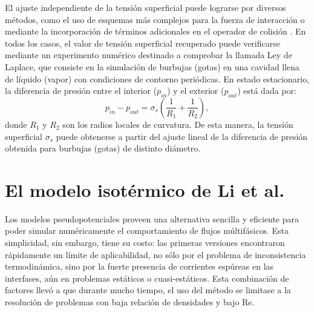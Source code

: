 El ajuste independiente de la tensi\'on superficial puede lograrse por diversos m\'etodos, como el uso de esquemas m\'as complejos para la fuerza de interacci\'on \cite{sbragaglia_generalized_2007, hu_contact_2016} o mediante la incorporaci\'on  de t\'erminos adicionales en el operador de colisi\'on \cite{li_achieving_2013}. En todos los casos, el valor de tensi\'on superficial recuperado puede verificarse mediante un experimento num\'erico destinado a comprobar la llamada Ley de Laplace, que consiste en la simulaci\'on de burbujas (gotas) en una cavidad llena de l\'iquido (vapor) con condiciones de contorno peri\'odicas. En estado estacionario, la diferencia de presi\'on entre el interior ($p_{in}$) y el exterior ($p_{out}$) est\'a dada por:
\begin{equation}
	p_{in}-p_{out} = \sigma_s \left( \dfrac{1}{R_1} + \dfrac{1}{R_2}\right),
	\label{eq:laplace}
\end{equation}
donde $R_1$ y $R_2$ son los radios locales de curvatura. De esta manera, la tensi\'on superficial $\sigma_s$ puede obtenerse a partir del ajuste lineal de la diferencia de presi\'on obtenida para burbujas (gotas) de distinto di\'ametro. 





\section{El modelo isot\'ermico de Li et al.}

Los modelos pseudopotenciales proveen una alternativa sencilla y eficiente para poder simular num\'ericamente el comportamiento de flujos m\'ultif\'asicos. Esta simplicidad, sin embargo, tiene su costo: las primeras versiones encontraron r\'apidamente un l\'imite de aplicabilidad, no s\'olo por el problema de inconsistencia termodin\'amica, sino por la fuerte presencia de corrientes esp\'ureas en las interfases, a\'un en problemas est\'aticos o cuasi-est\'aticos. Esta combinaci\'on de factores llev\'o a que durante mucho tiempo, el uso del m\'etodo \pp{} se limitase a la resoluci\'on de problemas con baja relaci\'on de densidades y bajo Re.

